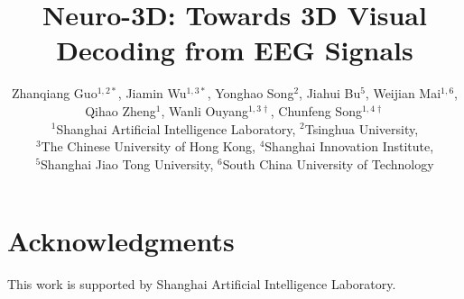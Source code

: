 \documentclass[10pt,twocolumn,letterpaper]{article}
\title{Neuro-3D: Towards 3D Visual Decoding from EEG Signals}
\author{%
	Zhanqiang Guo$^{1, 2*}$, Jiamin Wu$^{1, 3*}$, Yonghao  Song$^{2}$, Jiahui Bu$^{5}$, Weijian Mai$^{1, 6}$, \\ Qihao Zheng$^{1}$,  Wanli Ouyang$^{1, 3\dag}$, Chunfeng Song$^{1, 4\dag}$ \\[0.5em]
	$^{1}$Shanghai Artificial Intelligence Laboratory, $^{2}$Tsinghua University, \\$^{3}$The Chinese University of Hong Kong, $^{4}$Shanghai Innovation Institute,  \\$^{5}$Shanghai Jiao Tong University, $^{6}$South China University of Technology \\[0.3em] %
}
\begin{document}
	\maketitle
	\renewcommand{\thefootnote}{}
	\renewcommand{\thefootnote}{\arabic{footnote}}
	
	    
	
	
	
	
	
	
	\section*{Acknowledgments}
	This work is supported by Shanghai Artificial Intelligence Laboratory. 
	\newpage
	{
		\small
		
		
	}
	
	
\end{document}
